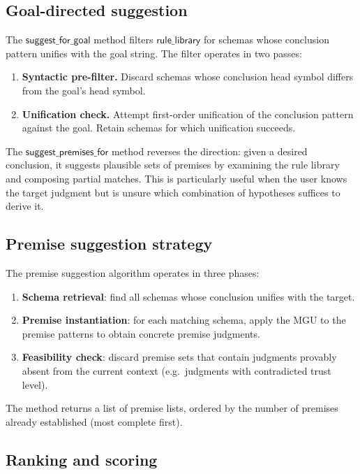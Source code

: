 \documentclass[11pt]{article}
\newcommand{\suggestForGoal}{\ensuremath{\mathsf{suggest\_for\_goal}}}
\begin{document}
\subsection{Goal-directed suggestion}\label{ssec:suggest-for-goal}

The $\suggestForGoal$ method filters $\mathsf{rule\_library}$ for
schemas whose conclusion pattern unifies with the goal string.
The filter operates in two passes:
\begin{enumerate}
  \item \textbf{Syntactic pre-filter.}  Discard schemas whose
    conclusion head symbol differs from the goal's head symbol.
  \item \textbf{Unification check.}  Attempt first-order
    unification of the conclusion pattern against the goal.  Retain
    schemas for which unification succeeds.
\end{enumerate}

\noindent
The $\mathsf{suggest\_premises\_for}$ method reverses the
direction: given a desired conclusion, it suggests plausible sets
of premises by examining the rule library and composing partial
matches.  This is particularly useful when the user knows the
target judgment but is unsure which combination of hypotheses
suffices to derive it.

\subsection{Premise suggestion strategy}\label{ssec:premise-sugg}

The premise suggestion algorithm operates in three phases:
\begin{enumerate}
  \item \textbf{Schema retrieval}: find all schemas whose
    conclusion unifies with the target.
  \item \textbf{Premise instantiation}: for each matching schema,
    apply the MGU to the premise patterns to obtain concrete
    premise judgments.
  \item \textbf{Feasibility check}: discard premise sets that
    contain judgments provably absent from the current context
    (e.g.\ judgments with contradicted trust level).
\end{enumerate}
The method returns a list of premise lists, ordered by the
number of premises already established (most complete first).

\subsection{Ranking and scoring}\label{ssec:ranking}
\end{document}
